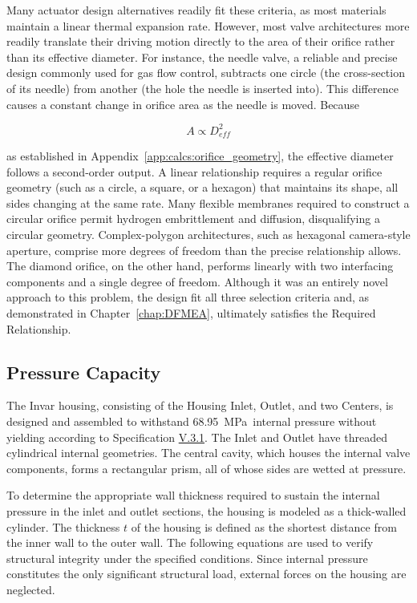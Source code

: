 \documentclass[12pt, letterpaper]{report}%
\newcounter{mycounter}           %
\newcounter{sub}[mycounter]      %
\newcommand{\specPressure}{\SI{68.95}{\mega \pascal}}%
\newcommand{\specref}[1]{\hyperref[tab:specs]{#1}}
\begin{document}
			Many actuator design alternatives readily fit these criteria, as most materials maintain a linear thermal expansion rate.
			However, most valve architectures more readily translate their driving motion directly to the area of their orifice rather than its effective diameter.
			For instance, the needle valve, a reliable and precise design commonly used for gas flow control, subtracts one circle (the cross-section of its needle) from another (the hole the needle is inserted into).
			This difference causes a constant change in orifice area as the needle is moved.
			Because

			\begin{equation*}
				A \propto D_{eff}^2
			\end{equation*}

			as established in Appendix~\ref{app:calcs:orifice_geometry}, the effective diameter follows a second-order output.
			A linear relationship requires a regular orifice geometry (such as a circle, a square, or a hexagon) that maintains its shape, all sides changing at the same rate.
			Many flexible membranes required to construct a circular orifice permit hydrogen embrittlement and diffusion, disqualifying a circular geometry.
			Complex-polygon architectures, such as hexagonal camera-style aperture, comprise more degrees of freedom than the precise relationship allows.
			The diamond orifice, on the other hand, performs linearly with two interfacing components and a single degree of freedom.
			Although it was an entirely novel approach to this problem, the design fit all three selection criteria and, as demonstrated in Chapter~\ref{chap:DFMEA}, ultimately satisfies the Required Relationship.

		\subsection{Pressure Capacity}
		\label{subsec:design:just:P}

			The Invar housing, consisting of the Housing Inlet, Outlet, and two Centers, is designed and assembled to withstand \specPressure\ internal pressure without yielding according to Specification \specref{V.3.1}. 
			The Inlet and Outlet have threaded cylindrical internal geometries.
			The central cavity, which houses the internal valve components, forms a rectangular prism, all of whose sides are wetted at pressure.

			To determine the appropriate wall thickness required to sustain the internal pressure in the inlet and outlet sections, the housing is modeled as a thick-walled cylinder.
			The thickness $t$ of the housing is defined as the shortest distance from the inner wall to the outer wall.
			The following equations are used to verify structural integrity under the specified conditions.
			Since internal pressure constitutes the only significant structural load, external forces on the housing are neglected.
\end{document}
